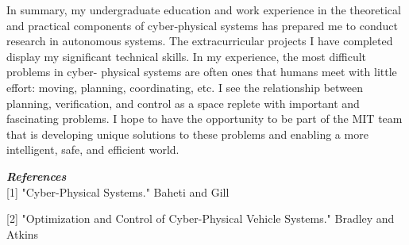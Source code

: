 \documentclass[]{letter}
\begin{document}

In summary, my undergraduate education and work experience in the theoretical and practical components of cyber‑physical systems has prepared me to conduct research in autonomous systems. The extracurricular projects I have completed display my significant technical skills. In my experience, the most difficult problems in cyber- physical systems are often ones that humans meet with little effort: moving, planning, coordinating, etc. I see the relationship between planning, verification, and control as a space replete with important and fascinating problems. I hope to have the opportunity to be part of the MIT team that is developing unique solutions to these problems and enabling a more intelligent, safe, and efficient world.

{\bf \emph{References}}\\

[1] "Cyber-Physical Systems." Baheti and Gill

[2] "Optimization and Control of Cyber-Physical Vehicle Systems." Bradley and Atkins
\end{document}
